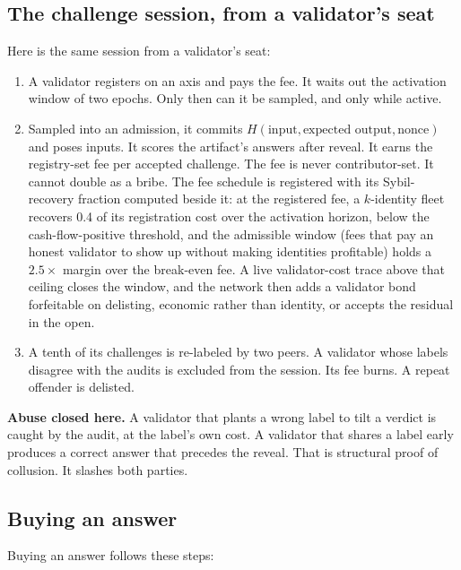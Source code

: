 \documentclass[11pt]{article}
\begin{document}
\subsection{The challenge session, from a validator's seat}

Here is the same session from a validator's seat:

\begin{enumerate}
    \item A validator registers on an axis and pays the fee. It
          waits out the activation window of two epochs. Only then can it
          be sampled, and only while active.
    \item Sampled into an admission, it commits
          $H(\text{input}, \text{expected output}, \text{nonce})$ and poses
          inputs. It scores the artifact's answers after reveal. It earns
          the registry-set fee per accepted challenge. The fee is never
          contributor-set. It cannot double as a bribe. The fee schedule
          is registered with its Sybil-recovery fraction computed beside
          it: at the registered fee, a $k$-identity fleet recovers 0.4 of
          its registration cost over the activation horizon, below the
          cash-flow-positive threshold, and the admissible window (fees
          that pay an honest validator to show up without making
          identities profitable) holds a $2.5\times$ margin over the
          break-even fee. A live validator-cost trace above that ceiling
          closes the window, and the network then adds a validator bond
          forfeitable on delisting, economic rather than identity, or
          accepts the residual in the open.
    \item A tenth of its challenges is re-labeled by two peers. A
          validator whose labels disagree with the audits is excluded from
          the session. Its fee burns. A repeat offender is delisted.
\end{enumerate}
\textbf{Abuse closed here.} A validator that plants a wrong label
to tilt a verdict is caught by the audit, at the label's own
cost. A validator that shares a label early produces a correct
answer that precedes the reveal. That is structural proof of
collusion. It slashes both parties.

\subsection{Buying an answer}

Buying an answer follows these steps:
\end{document}
